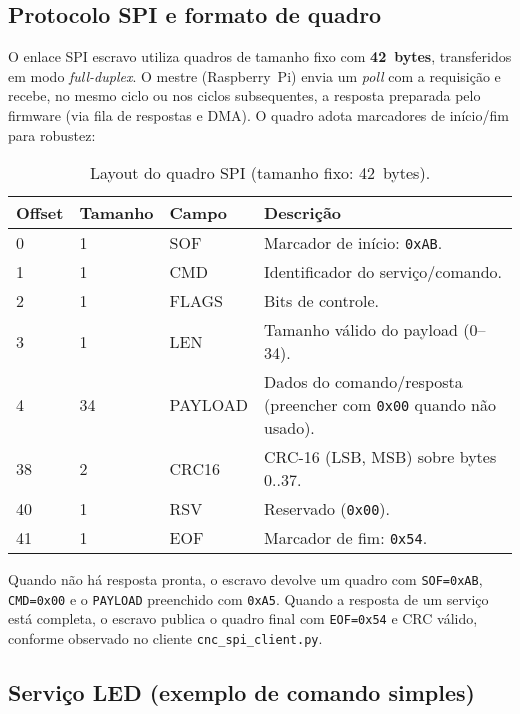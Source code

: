 \subsection*{Protocolo SPI e formato de quadro}

O enlace SPI escravo utiliza quadros de tamanho fixo com \textbf{42~bytes},
transferidos em modo \emph{full-duplex}. O mestre (Raspberry~Pi) envia um
\emph{poll} com a requisi\c{c}\~ao e recebe, no mesmo ciclo ou nos ciclos
subsequentes, a resposta preparada pelo firmware (via fila de respostas e
DMA). O quadro adota marcadores de in\'icio/fim para robustez:

\begin{table}[h]
  \centering
  \caption{Layout do quadro SPI (tamanho fixo: 42~bytes).}
  \label{tab:spi-frame}
  \setlength{\tabcolsep}{4pt}\footnotesize
  \begin{tabularx}{\textwidth}{lllX}
    \toprule
    Offset & Tamanho & Campo & Descri\c{c}\~ao \\
    \midrule
    0 & 1 & SOF & Marcador de in\'icio: \texttt{0xAB}. \\
    1 & 1 & CMD & Identificador do servi\c{c}o/comando. \\
    2 & 1 & FLAGS & Bits de controle. \\
    3 & 1 & LEN & Tamanho v\'alido do payload (0--34). \\
    4 & 34 & PAYLOAD & Dados do comando/resposta (preencher com \texttt{0x00} quando n\~ao usado). \\
    38 & 2 & CRC16 & CRC-16 (LSB, MSB) sobre bytes 0..37. \\
    40 & 1 & RSV & Reservado (\texttt{0x00}). \\
    41 & 1 & EOF & Marcador de fim: \texttt{0x54}. \\
    \bottomrule
  \end{tabularx}
\end{table}

Quando n\~ao h\'a resposta pronta, o escravo devolve um quadro com
\texttt{SOF=0xAB}, \texttt{CMD=0x00} e o \texttt{PAYLOAD} preenchido com
\texttt{0xA5}. Quando a resposta de um servi\c{c}o est\'a completa, o escravo
publica o quadro final com \texttt{EOF=0x54} e CRC v\'alido, conforme
observado no cliente \texttt{cnc\_spi\_client.py}.

\subsection*{Servi\c{c}o LED (exemplo de comando simples)}

